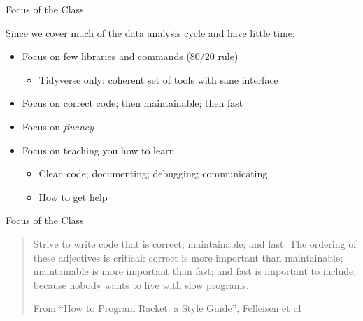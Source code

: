 \documentclass[
  ignorenonframetext,
]{beamer}
\providecommand{\tightlist}{%
  \setlength{\itemsep}{0pt}\setlength{\parskip}{0pt}}
\begin{document}
\begin{frame}{Focus of the Class}
\protect\hypertarget{focus-of-the-class}{}

Since we cover much of the data analysis cycle and have little time:

\begin{itemize}
\tightlist
\item
  Focus on few libraries and commands (80/20 rule)

  \begin{itemize}
  \tightlist
  \item
    Tidyverse only: coherent set of tools with sane interface
  \end{itemize}
\item
  Focus on correct code; then maintainable; then fast
\item
  Focus on \emph{fluency}
\item
  Focus on teaching you how to learn

  \begin{itemize}
  \tightlist
  \item
    Clean code; documenting; debugging; communicating
  \item
    How to get help
  \end{itemize}
\end{itemize}

\end{frame}

\begin{frame}{Focus of the Class}
\protect\hypertarget{focus-of-the-class-1}{}

\begin{quote}
Strive to write code that is correct; maintainable; and fast. The
ordering of these adjectives is critical: correct is more important than
maintainable; maintainable is more important than fast; and fast is
important to include, because nobody wants to live with slow programs.

From ``How to Program Racket: a Style Guide'', Felleisen et al
\end{quote}

\end{frame}
\end{document}
